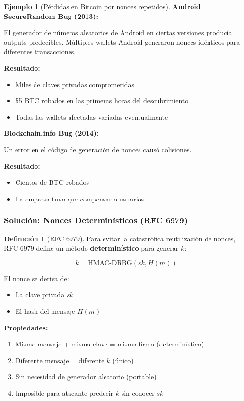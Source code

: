\documentclass[11pt,a4paper,twoside,openright]{book}
\theoremstyle{definition}
\newtheorem{definition}{Definición}[chapter]
\newtheorem{example}{Ejemplo}[chapter]
\theoremstyle{plain}
\theoremstyle{remark}
\begin{document}
\begin{example}[Pérdidas en Bitcoin por nonces repetidos]
\textbf{Android SecureRandom Bug (2013):}

El generador de números aleatorios de Android en ciertas versiones producía outputs predecibles. Múltiples wallets Android generaron nonces idénticos para diferentes transacciones.

\textbf{Resultado:}
\begin{itemize}
    \item Miles de claves privadas comprometidas
    \item 55 BTC robados en las primeras horas del descubrimiento
    \item Todas las wallets afectadas vaciadas eventualmente
\end{itemize}

\textbf{Blockchain.info Bug (2014):}

Un error en el código de generación de nonces causó colisiones.

\textbf{Resultado:}
\begin{itemize}
    \item Cientos de BTC robados
    \item La empresa tuvo que compensar a usuarios
\end{itemize}
\end{example}

\subsubsection{Solución: Nonces Determinísticos (RFC 6979)}

\begin{definition}[RFC 6979]
Para evitar la catastrófica reutilización de nonces, RFC 6979 define un método \textbf{determinístico} para generar $k$:

\[ k = \text{HMAC-DRBG}(sk, H(m)) \]

El nonce se deriva de:
\begin{itemize}
    \item La clave privada $sk$
    \item El hash del mensaje $H(m)$
\end{itemize}

\textbf{Propiedades:}
\begin{enumerate}
    \item Mismo mensaje + misma clave = misma firma (determinístico)
    \item Diferente mensaje = diferente $k$ (único)
    \item Sin necesidad de generador aleatorio (portable)
    \item Imposible para atacante predecir $k$ sin conocer $sk$
\end{enumerate}
\end{definition}
\end{document}
